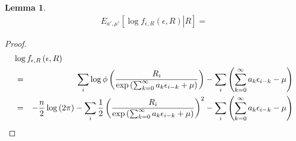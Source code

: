 \documentclass{article}
\newtheorem{lemma}{Lemma}
\begin{document}
\begin{lemma}
  \begin{eqnarray*}
    E_{a',\mu'}\left[\left. \log f_{\epsilon,R}\left(\epsilon,R\right) \right| R \right] = 
  \end{eqnarray*}
\end{lemma}
\begin{proof}
  \begin{eqnarray*}
    \lefteqn{\log f_{\epsilon,R}\left(\epsilon,R\right)}\\
    & = & \sum_i \log \phi\left( \frac{R_i}{\exp\left(\sum_{k=0}^\infty a_k \epsilon_{i-k} + \mu\right)}\right) - \sum_i \left(\sum_{k=0}^\infty a_k \epsilon_{i-k} - \mu\right)\\
    & = & -\frac{n}{2} \log\left(2 \pi\right) - \sum_i \frac{1}{2}\left( \frac{R_i}{\exp\left(\sum_{k=0}^\infty a_k \epsilon_{i-k} + \mu\right)}\right)^2 - \sum_i \left(\sum_{k=0}^\infty a_k \epsilon_{i-k} - \mu\right)\\
  \end{eqnarray*}
\end{proof}
\end{document}
